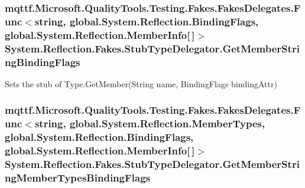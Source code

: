 \hypertarget{class_system_1_1_reflection_1_1_fakes_1_1_stub_type_delegator_a84779be94e65813ddc32197e79cfb10f}{
\subsubsection[{Get\-Member\-String\-Binding\-Flags}]{\setlength{\rightskip}{0pt plus 5cm}mqttf.\-Microsoft.\-Quality\-Tools.\-Testing.\-Fakes.\-Fakes\-Delegates.\-Func$<$string, global.\-System.\-Reflection.\-Binding\-Flags, global.\-System.\-Reflection.\-Member\-Info\mbox{[}$\,$\mbox{]}$>$ System.\-Reflection.\-Fakes.\-Stub\-Type\-Delegator.\-Get\-Member\-String\-Binding\-Flags}}\label{class_system_1_1_reflection_1_1_fakes_1_1_stub_type_delegator_a84779be94e65813ddc32197e79cfb10f}


Sets the stub of Type.\-Get\-Member(\-String name, Binding\-Flags binding\-Attr)

\hypertarget{class_system_1_1_reflection_1_1_fakes_1_1_stub_type_delegator_a43513492c2a44728a2340b91e5dcf0d0}{
\subsubsection[{Get\-Member\-String\-Member\-Types\-Binding\-Flags}]{\setlength{\rightskip}{0pt plus 5cm}mqttf.\-Microsoft.\-Quality\-Tools.\-Testing.\-Fakes.\-Fakes\-Delegates.\-Func$<$string, global.\-System.\-Reflection.\-Member\-Types, global.\-System.\-Reflection.\-Binding\-Flags, global.\-System.\-Reflection.\-Member\-Info\mbox{[}$\,$\mbox{]}$>$ System.\-Reflection.\-Fakes.\-Stub\-Type\-Delegator.\-Get\-Member\-String\-Member\-Types\-Binding\-Flags}}\label{class_system_1_1_reflection_1_1_fakes_1_1_stub_type_delegator_a43513492c2a44728a2340b91e5dcf0d0}


